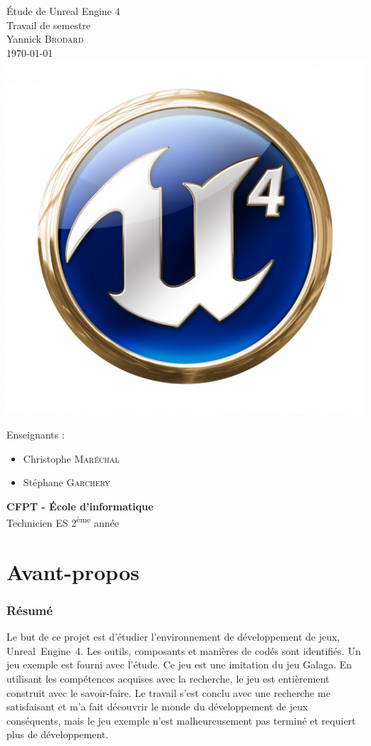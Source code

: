 \documentclass[11pt, a4paper, oneside]{article}
\begin{document}
\begin{center}
{\Huge{Étude de Unreal Engine 4}} \\[0.5cm]
{\LARGE{Travail de semestre}}\\[0.5cm]
{\Large{Yannick \textsc{Brodard}}}\\[0.3cm]
\today\\
\includegraphics[scale=0.4]{UE4_logo}
\end{center}
Enseignants :
\begin{itemize}
\item Christophe \textsc{Maréchal}
\item Stéphane \textsc{Garchery}\\[3cm]
\end{itemize}
\textbf{CFPT - École d'informatique}\\
Technicien ES 2\textsuperscript{ème} année
\thispagestyle{empty}
\newpage
\part{Avant-propos}
\section{Résumé}
Le but de ce projet est d'étudier l'environnement de développement de jeux, {Unreal~Engine~4}. Les outils, composants et manières de codés sont identifiés. Un jeu exemple est fourni avec l'étude. Ce jeu est une imitation du jeu Galaga. En utilisant les compétences acquises avec la recherche, le jeu est entièrement construit avec le savoir-faire. Le travail s'est conclu avec une recherche me satisfaisant et m'a fait découvrir le monde du développement de jeux conséquents, mais le jeu exemple n'est malheureusement pas terminé et requiert plus de développement.
\end{document}
